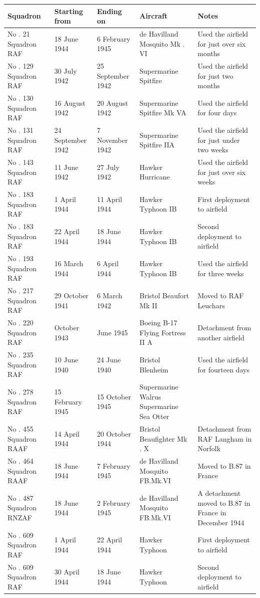 \documentclass{article}
\begin{document}
\begin{tabular}{lllll}
\toprule
Squadron & Starting from & Ending on & Aircraft & Notes \\
\midrule
No . 21 Squadron RAF & 18 June 1944 & 6 February 1945 & de Havilland Mosquito Mk . VI & Used the airfield for just over six months \\
No . 129 Squadron RAF & 30 July 1942 & 25 September 1942 & Supermarine Spitfire & Used the airfield for just two months \\
No . 130 Squadron RAF & 16 August 1942 & 20 August 1942 & Supermarine Spitfire Mk VA & Used the airfield for four days \\
No . 131 Squadron RAF & 24 September 1942 & 7 November 1942 & Supermarine Spitfire IIA & Used the airfield for just under two weeks \\
No . 143 Squadron RAF & 11 June 1942 & 27 July 1942 & Hawker Hurricane & Used the airfield for just over six weeks \\
No . 183 Squadron RAF & 1 April 1944 & 11 April 1944 & Hawker Typhoon IB & First deployment to airfield \\
No . 183 Squadron RAF & 22 April 1944 & 18 June 1944 & Hawker Typhoon IB & Second deployment to airfield \\
No . 193 Squadron RAF & 16 March 1944 & 6 April 1944 & Hawker Typhoon IB & Used the airfield for three weeks \\
No . 217 Squadron RAF & 29 October 1941 & 6 March 1942 & Bristol Beaufort Mk II & Moved to RAF Leuchars \\
No . 220 Squadron RAF & October 1943 & June 1945 & Boeing B-17 Flying Fortress II A & Detachment from another airfield \\
No . 235 Squadron RAF & 10 June 1940 & 24 June 1940 & Bristol Blenheim & Used the airfield for fourteen days \\
No . 278 Squadron RAF & 15 February 1945 & 15 October 1945 & Supermarine Walrus Supermarine Sea Otter &  \\
No . 455 Squadron RAAF & 14 April 1944 & 20 October 1944 & Bristol Beaufighter Mk . X & Detachment from RAF Langham in Norfolk \\
No . 464 Squadron RAAF & 18 June 1944 & 7 February 1945 & de Havilland Mosquito FB.Mk.VI & Moved to B.87 in France \\
No . 487 Squadron RNZAF & 18 June 1944 & 2 February 1945 & de Havilland Mosquito FB.Mk.VI & A detachment moved to B.87 in France in December 1944 \\
No . 609 Squadron RAF & 1 April 1944 & 22 April 1944 & Hawker Typhoon & First deployment to airfield \\
No . 609 Squadron RAF & 30 April 1944 & 18 June 1944 & Hawker Typhoon & Second deployment to airfield \\
\bottomrule
\end{tabular}
\end{document}
